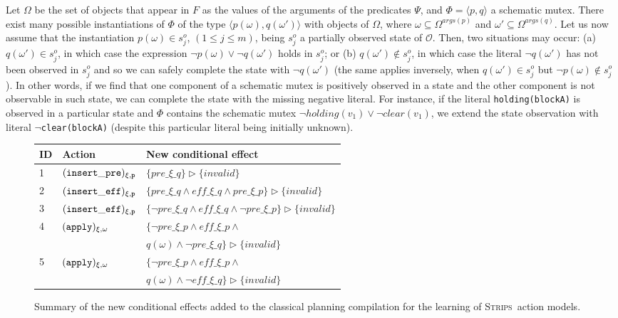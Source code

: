 \documentclass{article}
\newcommand{\tup}[1]{{\langle #1 \rangle}}
\newcommand{\strips}{\textsc{Strips}}
\begin{document}
Let $\Omega$ be the set of objects that appear in $F$ as the values of the arguments of the predicates $\Psi$, and $\Phi=\tup{p,q}$ a schematic mutex. There exist many possible instantiations of $\Phi$ of the type $\tup{p(\omega),q(\omega')}$ with objects of $\Omega$, where $\omega\subseteq\Omega^{args(p)}$ and $\omega'\subseteq\Omega^{args(q)}$. Let us now assume that the instantiation $p(\omega) \in s_j^o$, {\small $(1\leq j\leq m)$}, being $s_j^o$ a partially observed state of $\mathcal{O}$. Then, two situations may occur: (a) $q(\omega') \in s_j^o$, in which case the expression $\neg p(\omega) \vee \neg q(\omega')$ holds in $s_j^o$; or (b) $q(\omega') \notin s_j^o$, in which case the literal $\neg q(\omega')$ has not been observed in $s_j^o$ and so we can safely complete the state with $\neg q(\omega')$ (the same applies inversely, when $q(\omega') \in s_j^o$ but $\neg p(\omega) \notin s_j^o$). In other words, if we find that one component of a schematic mutex is positively observed in a state and the other component is not observable in such state, we can complete the state with the missing negative literal. For instance, if the literal {\tt\small holding(blockA)} is observed in a particular state and $\Phi$ contains the schematic mutex $\neg holding(v_1)\vee\neg clear(v_1)$, we extend the state observation with literal {\tt\small $\neg$clear(blockA)} (despite this particular literal being initially unknown).

\begin{figure}
	\begin{footnotesize}
		\begin{tabular}{lll}
			{\bf ID} & {\bf Action} & {\bf New conditional effect}\\\hline
			1&${\tt (insert\_pre)_{\xi,p}}$&$\{pre\_\xi\_q\}\rhd\{invalid\}$\\
			2&${\tt (insert\_eff)_{\xi,p}}$&$\{pre\_\xi\_q\wedge eff\_\xi\_q\wedge pre\_\xi\_p\}\rhd\{invalid\}$\\
			3&${\tt (insert\_eff)_{\xi,p}}$&$\{\neg pre\_\xi\_q\wedge eff\_\xi\_q\wedge \neg pre\_\xi\_p\}\rhd\{invalid\}$\\
			4&${\tt (apply)_{\xi,\omega}}$&$\{\neg pre\_\xi\_p \wedge eff\_\xi\_p \wedge $\\
			&&$q(\omega)\wedge \neg pre\_\xi\_q\}\rhd\{invalid\}$\\
			5&${\tt (apply)_{\xi,\omega}}$&$\{\neg pre\_\xi\_p \wedge eff\_\xi\_p \wedge $\\
			&&$q(\omega)\wedge \neg eff\_\xi\_q\}\rhd\{invalid\}$
		\end{tabular}
	\end{footnotesize}
	\caption{\small Summary of the new conditional effects added to the classical planning compilation for the learning of \strips\ action models.}
	\label{fig:ceffects}
\end{figure}
\end{document}

